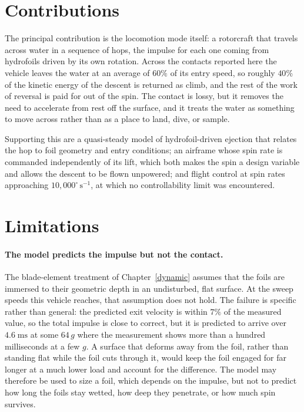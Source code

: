 \section{Contributions}

The principal contribution is the locomotion mode itself: a rotorcraft that
travels across water in a sequence of hops, the impulse for each one coming
from hydrofoils driven by its own rotation.  Across the contacts reported here
the vehicle leaves the water at an average of $60\%$ of its entry speed, so
roughly $40\%$ of the kinetic energy of the descent is returned as climb, and
the rest of the work of reversal is paid for out of the spin.  The contact is
lossy, but it removes the need to accelerate from rest off the surface, and it
treats the water as something to move across rather than as a place to land,
dive, or sample.

Supporting this are a quasi-steady model of hydrofoil-driven ejection that
relates the hop to foil geometry and entry conditions; an airframe whose spin
rate is commanded independently of its lift, which both makes the spin a
design variable and allows the descent to be flown unpowered; and flight
control at spin rates approaching
$10{,}000^{\circ}\,\mathrm{s^{-1}}$, at which no controllability limit was
encountered.

\section{Limitations}

\paragraph{The model predicts the impulse but not the contact.}
The blade-element treatment of Chapter~\ref{dynamic} assumes that the foils
are immersed to their geometric depth in an undisturbed, flat surface.  At the
sweep speeds this vehicle reaches, that assumption does not hold.  The failure
is specific rather than general: the predicted exit velocity is within $7\%$
of the measured value, so the total impulse is close to correct, but it is
predicted to arrive over $4.6\;\mathrm{ms}$ at some $64\,g$ where the
measurement shows more than a hundred milliseconds at a few $g$.  A surface
that deforms away from the foil, rather than standing flat while the foil
cuts through it, would keep the foil engaged for far longer at a much lower
load and account for the difference.  The model may therefore be used to size
a foil, which depends on the impulse, but not to predict how long the foils
stay wetted, how deep they penetrate, or how much spin survives.

